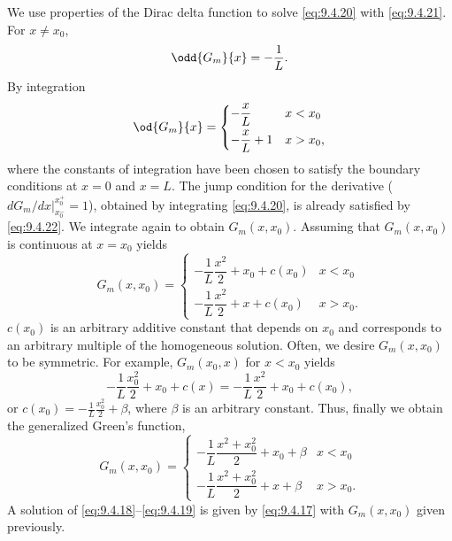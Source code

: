We use properties of the Dirac delta function to solve \eqref{eq:9.4.20} with \eqref{eq:9.4.21}.  For $x \neq x_0$,
\[
\odd{G_m}{x} = -\frac{1}{L}.
\]
By integration
\begin{equation}
\label{eq:9.4.22}
\od{G_m}{x} = \begin{cases} -\dfrac{x}{L} & x < x_0 \\[6pt] -\dfrac{x}{L} + 1 & x > x_0, \end{cases}
\end{equation}
where the constants of integration have been chosen to satisfy the boundary conditions at $x=0$ and $x=L$.  The jump condition for the derivative ($dG_m/dx|_{x_0^-}^{x_0^+} = 1$), obtained by integrating \eqref{eq:9.4.20}, is already satisfied by \eqref{eq:9.4.22}.  We integrate again to obtain $G_m(x,x_0)$.  Assuming that $G_m(x,x_0)$ is continuous at $x = x_0$ yields
\[
G_m(x,x_0) = \begin{cases} -\dfrac{1}{L}\dfrac{x^2}{2} + x_0 + c(x_0) & x < x_0 \\[8pt] -\dfrac{1}{L}\dfrac{x^2}{2} + x + c(x_0) & x > x_0. \end{cases}
\]
$c(x_0)$ is an arbitrary additive constant that depends on $x_0$ and corresponds to an arbitrary multiple of the homogeneous solution.  Often, we desire $G_m(x,x_0)$ to be symmetric.  For example, $G_m(x_0,x)$ for $x < x_0$ yields
\[
-\frac{1}{L}\frac{x_0^2}{2} + x_0 + c(x) = -\frac{1}{L}\frac{x^2}{2} + x_0 + c(x_0),
\]
or $c(x_0) = -\frac{1}{L}\frac{x_0^2}{2} + \beta$, where $\beta$ is an arbitrary constant.  Thus, finally we obtain the generalized Green's function,
\begin{equation}
\label{eq:9.4.23}
G_m(x,x_0) = \begin{cases}
-\dfrac{1}{L}\dfrac{x^2+x_0^2}{2} + x_0 + \beta & x < x_0 \\[8pt]
-\dfrac{1}{L}\dfrac{x^2+x_0^2}{2} + x + \beta & x > x_0.
\end{cases}
\end{equation}
A solution of \eqref{eq:9.4.18}--\eqref{eq:9.4.19} is given by \eqref{eq:9.4.17} with $G_m(x,x_0)$ given previously.

